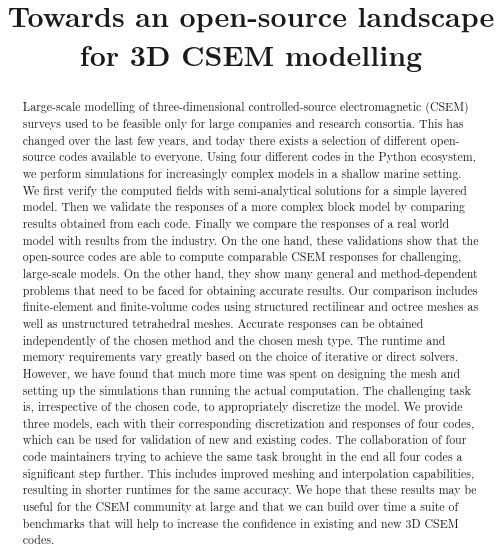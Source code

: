 \documentclass[a4paper, extra, camera,%
]{gji}
\title[3D CSEM Open-Source Landscape]{Towards an open-source landscape for 3D CSEM modelling}
\makeatletter
\let\zz@tabular\@tabular
\let\zzendtabular\endtabular
\let\zz@xtabularcr\@xtabularcr
\let\zz@tabclassz\@tabclassz
\let\zz@tabclassiv \@tabclassiv
\let\zz@tabarray\@tabarray
\makeatother
\begin{document}
\label{firstpage}

{\makeatletter
\let\@tabular\zz@tabular
\let\endtabular\zzendtabular
\let\@xtabularcr\zz@xtabularcr
\let\@tabclassz\zz@tabclassz
\let\@tabclassiv \zz@tabclassiv
\let\@tabarray\zz@tabarray
\maketitle
}

\begin{abstract}
Large-scale modelling of three-dimensional controlled-source electromagnetic (CSEM) surveys used to be feasible only for large companies and research consortia. This has changed over the last few years, and today there exists a selection of different open-source codes available to everyone. Using four different codes in the Python ecosystem, we perform simulations for increasingly complex models in a shallow marine setting. We first verify the computed fields with semi-analytical solutions for a simple layered model. Then we validate the responses of a more complex block model by comparing results obtained from each code. Finally we compare the responses of a real world model with results from the industry. On the one hand, these validations show that the open-source codes are able to compute comparable CSEM responses for challenging, large-scale models. On the other hand, they show many general and method-dependent problems that need to be faced for obtaining accurate results. Our comparison includes finite-element and finite-volume codes using structured rectilinear and octree meshes as well as unstructured tetrahedral meshes. Accurate responses can be obtained independently of the chosen method and the chosen mesh type. The runtime and memory requirements vary greatly based on the choice of iterative or direct solvers. However, we have found that much more time was spent on designing the mesh and setting up the simulations than running the actual computation. The challenging task is, irrespective of the chosen code, to appropriately discretize the model. We provide three models, each with their corresponding discretization and responses of four codes, which can be used for validation of new and existing codes. The collaboration of four code maintainers trying to achieve the same task brought in the end all four codes a significant step further. This includes improved meshing and interpolation capabilities, resulting in shorter runtimes for the same accuracy. We hope that these results may be useful for the CSEM community at large and that we can build over time a suite of benchmarks that will help to increase the confidence in existing and new 3D CSEM codes.
\end{abstract}
\end{document}
